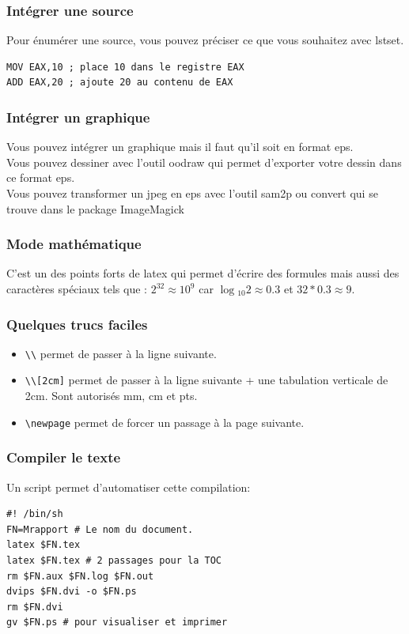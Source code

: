 \subsubsection {Intégrer une source}
Pour énumérer une source, vous pouvez préciser ce que vous souhaitez avec lstset. 
\begin{lstlisting}
MOV EAX,10 ; place 10 dans le registre EAX
ADD EAX,20 ; ajoute 20 au contenu de EAX
\end{lstlisting}
\subsubsection {Intégrer un graphique}
Vous pouvez intégrer un graphique mais il faut qu'il soit en format eps.\\
Vous pouvez dessiner avec l'outil oodraw qui permet d'exporter votre dessin dans ce format eps.\\
Vous pouvez transformer un jpeg en eps avec l'outil sam2p ou convert qui se trouve dans le package ImageMagick\\
\subsubsection {Mode mathématique}
C'est un des points forts de latex qui permet d'écrire des formules mais aussi des caractères spéciaux tels que :
$2^{32} \approx 10^{9}$ car $\log{_{10}}{2} \approx 0.3$ et $32*0.3 \approx 9$.
\subsubsection {Quelques trucs faciles}
\begin{itemize}
\item \verb+\\+ permet de passer à la ligne suivante.
\item \verb+\\[2cm]+ permet de passer à la ligne suivante + une tabulation verticale de 2cm. Sont autorisés mm, cm et pts.
\item \verb+\newpage+ permet de forcer un passage à la page suivante.
\end{itemize}
\subsubsection {Compiler le texte}
Un script permet d'automatiser cette compilation:
\begin{lstlisting}
#! /bin/sh
FN=Mrapport # Le nom du document.
latex $FN.tex
latex $FN.tex # 2 passages pour la TOC
rm $FN.aux $FN.log $FN.out
dvips $FN.dvi -o $FN.ps
rm $FN.dvi
gv $FN.ps # pour visualiser et imprimer
\end{lstlisting}
